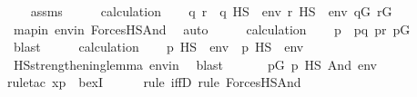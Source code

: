 \begin{isabellebody}
\isanewline
\ \ \isamarkupfalse%
\ assms\isanewline
\ \ \isamarkupfalse%
\ \isamarkupfalse%
\ calculation\isanewline
\ \ \isamarkupfalse%
\ q\ r\ \ {\isachardoublequoteopen}q\ {\isasymtturnstile}HS\ {\isasymphi}\ env{\isachardoublequoteclose}\ {\isachardoublequoteopen}r\ {\isasymtturnstile}HS\ {\isasympsi}\ env{\isachardoublequoteclose}\ {\isachardoublequoteopen}q{\isasymin}G{\isachardoublequoteclose}\ {\isachardoublequoteopen}r{\isasymin}G{\isachardoublequoteclose}\isanewline
\ \ \ \ \isamarkupfalse%
\ mapin\ envin\ ForcesHS{\isacharunderscore}{\kern0pt}And\ \isamarkupfalse%
\ auto\isanewline
\ \ \isamarkupfalse%
\ \isamarkupfalse%
\ calculation\isanewline
\ \ \isamarkupfalse%
\ p\ \ {\isachardoublequoteopen}p{\isasympreceq}q{\isachardoublequoteclose}\ {\isachardoublequoteopen}p{\isasympreceq}r{\isachardoublequoteclose}\ {\isachardoublequoteopen}p{\isasymin}G{\isachardoublequoteclose}\isanewline
\ \ \ \ \isamarkupfalse%
\ blast\isanewline
\ \ \isamarkupfalse%
\ \isamarkupfalse%
\ calculation\isanewline
\ \ \isamarkupfalse%
\ {\isachardoublequoteopen}{\isacharparenleft}{\kern0pt}p\ {\isasymtturnstile}HS\ {\isasymphi}\ env{\isacharparenright}{\kern0pt}\ {\isasymand}\ {\isacharparenleft}{\kern0pt}p\ {\isasymtturnstile}HS\ {\isasympsi}\ env{\isacharparenright}{\kern0pt}{\isachardoublequoteclose}\isanewline
\ \ \ \ \isamarkupfalse%
\ HS{\isacharunderscore}{\kern0pt}strengthening{\isacharunderscore}{\kern0pt}lemma\ envin\ \isamarkupfalse%
\ {\isacharparenleft}{\kern0pt}blast{\isacharparenright}{\kern0pt}\isanewline
\ \ \isamarkupfalse%
\isanewline
\ \ \isamarkupfalse%
\ {\isachardoublequoteopen}{\isasymexists}p{\isasymin}G{\isachardot}{\kern0pt}\ {\isacharparenleft}{\kern0pt}p\ {\isasymtturnstile}HS\ And{\isacharparenleft}{\kern0pt}{\isasymphi}{\isacharcomma}{\kern0pt}{\isasympsi}{\isacharparenright}{\kern0pt}\ env{\isacharparenright}{\kern0pt}{\isachardoublequoteclose}\isanewline
\ \ \ \ \isamarkupfalse%
{\isacharparenleft}{\kern0pt}rule{\isacharunderscore}{\kern0pt}tac\ x{\isacharequal}{\kern0pt}p\ \ bexI{\isacharparenright}{\kern0pt}\isanewline
\ \ \ \ \ \isamarkupfalse%
{\isacharparenleft}{\kern0pt}rule\ iffD{}{\isacharcomma}{\kern0pt}\ rule\ ForcesHS{\isacharunderscore}{\kern0pt}And{\isacharparenright}{\kern0pt}\isanewline

\end{isabellebody}
